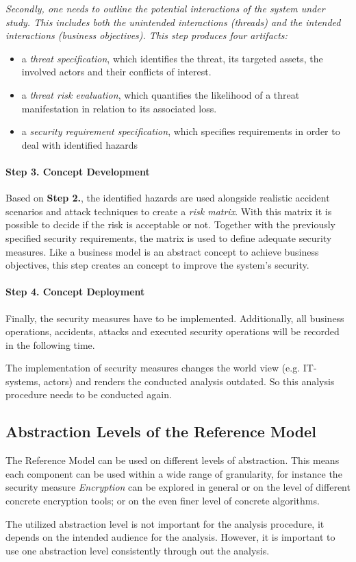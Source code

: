 \documentclass[runningheads,a4paper]{llncs}
\newenvironment{LGContent}
{ \par\color{blue} \it \small }
{ \par }
\begin{document}
\begin{LGContent}
Secondly, one needs to outline the potential interactions of the system under study.
This includes both the unintended interactions (threads) and the intended interactions (business objectives).
This step produces four artifacts:
\begin{itemize}
\item a \emph{threat specification}, which identifies the threat, its targeted assets, the involved actors and their conflicts of interest.
\item a \emph{threat risk evaluation}, which quantifies the likelihood of a threat manifestation in relation to its associated loss.
\item a \emph{security requirement specification}, which specifies requirements in order to deal with identified hazards
\end{itemize}

\paragraph*{Step 3. Concept Development}

Based on \textbf{Step 2.}, the identified hazards are used alongside realistic accident scenarios and attack techniques to create a \emph{risk matrix}.
With this matrix it is possible to decide if the risk is acceptable or not.
Together with the previously specified security requirements, the matrix is used to define adequate security measures.
Like a business model is an abstract concept to achieve business objectives, this step creates an concept to improve the system's security.

\paragraph*{Step 4. Concept Deployment}

Finally, the security measures have to be implemented.
Additionally, all business operations, accidents, attacks and executed security operations will be recorded in the following time.

The implementation of security measures changes the world view (e.g. IT-systems, actors) and renders the conducted analysis outdated.
So this analysis procedure needs to be conducted again.

\subsection{Abstraction Levels of the Reference Model}

The Reference Model can be used on different levels of abstraction.
This means each component can be used within a wide range of granularity, for instance the security measure \emph{Encryption} can be explored in general or on the level of different concrete encryption tools; or on the even finer level of concrete algorithms.

The utilized abstraction level is not important for the analysis procedure, it depends on the intended audience for the analysis.
However, it is important to use one abstraction level consistently through out the analysis.
\end{LGContent}
\end{document}
